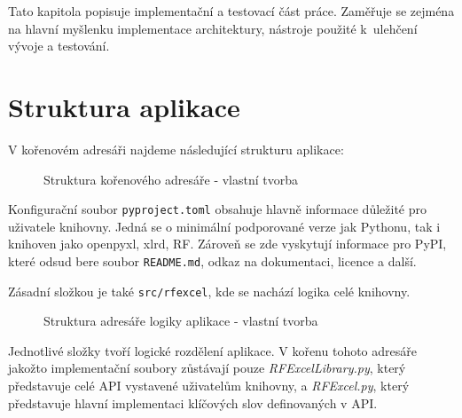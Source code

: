 Tato kapitola popisuje implementační a testovací část práce. Zaměřuje se zejména na hlavní myšlenku implementace architektury, nástroje použité k~ulehčení vývoje a testování.

\section{Struktura aplikace}

V kořenovém adresáři najdeme následující strukturu aplikace:

\begin{figure}[H]
    \captionsetup{name=Struktura}
    \vspace{1ex} 


    \caption{Struktura kořenového adresáře - vlastní tvorba}
    \label{fig:placeholder}
\end{figure}

Konfigurační soubor \texttt{pyproject.toml} obsahuje hlavně informace důležité pro uživatele knihovny. Jedná se o minimální podporované verze jak Pythonu, tak i knihoven jako openpyxl, xlrd, RF. Zároveň se zde vyskytují informace pro PyPI, které odsud bere soubor \texttt{README.md}, odkaz na dokumentaci, licence a další.

Zásadní složkou je také \texttt{src/rfexcel}, kde se nachází logika celé knihovny.

\begin{figure}[H]
    \captionsetup{name=Struktura}
    \vspace{1ex} 


    \caption{Struktura adresáře logiky aplikace - vlastní tvorba}
    \label{fig:placeholder}
\end{figure}

Jednotlivé složky tvoří logické rozdělení aplikace. V kořenu tohoto adresáře jakožto implementační soubory zůstávají pouze \textit{RFExcelLibrary.py}, který představuje celé API vystavené uživatelům knihovny, a \textit{RFExcel.py}, který představuje hlavní implementaci klíčových slov definovaných v API.

